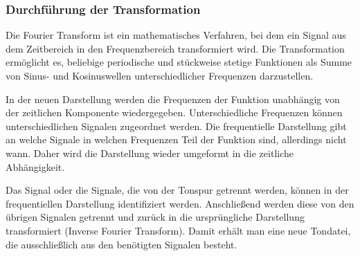 \par

\subsubsection{Durchführung der Transformation}

Die Fourier Transform ist ein mathematisches Verfahren, bei dem ein Signal aus dem Zeitbereich in den Frequenzbereich transformiert wird. Die Transformation ermöglicht es, beliebige periodische und stückweise stetige Funktionen als Summe von Sinus- und Kosinuswellen unterschiedlicher Frequenzen darzustellen.

\par

 
\par

In der neuen Darstellung werden die Frequenzen der Funktion unabhängig von der zeitlichen Komponente wiedergegeben. Unterschiedliche Frequenzen können unterschiedlichen Signalen zugeordnet werden. Die frequentielle Darstellung gibt an welche Signale in welchen Frequenzen Teil der Funktion sind, allerdings nicht wann. Daher wird die Darstellung wieder umgeformt in die zeitliche Abhängigkeit.

\par

Das Signal oder die Signale, die von der Tonspur getrennt werden, können in der frequentiellen Darstellung identifiziert werden. Anschließend werden diese von den übrigen Signalen getrennt und zurück in die ursprüngliche Darstellung transformiert (Inverse Fourier Transform). Damit erhält man eine neue Tondatei, die ausschließlich aus den benötigten Signalen besteht.





